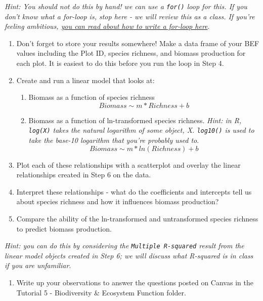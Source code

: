 \documentclass[]{article}
\providecommand{\tightlist}{%
  \setlength{\itemsep}{0pt}\setlength{\parskip}{0pt}}
\begin{document}
\emph{Hint: You \emph{should not} do this by hand! we can use a
\texttt{for()} loop for this. If you don't know what a for-loop is, stop
here - we will review this as a class. If you're feeling ambitious,
\href{https://www.r-bloggers.com/how-to-write-the-first-for-loop-in-r/}{you
can read about how to write a for-loop here}}.

\begin{enumerate}
\def\labelenumi{\arabic{enumi}.}
\setcounter{enumi}{4}
\item
  Don't forget to store your results somewhere! Make a data frame of
  your BEF values including the Plot ID, species richness, and biomass
  production for each plot. It is easiest to do this before you run the
  loop in Step 4.
\item
  Create and run a linear model that looks at:

  \begin{enumerate}
  \def\labelenumii{\alph{enumii}.}
  \item
    Biomass as a function of species richness
    \[Biomass \sim m * Richness + b\]
  \item
    Biomass as a function of ln-transformed species richness.
    \emph{Hint: in R, \texttt{log(X)} takes the natural logarithm of
    some object, X. \texttt{log10()} is used to take the base-10
    logarithm that you're probably used to}.
    \[Biomass \sim m * ln(Richness) + b\]
  \end{enumerate}
\item
  Plot each of these relationships with a scatterplot and overlay the
  linear relationships created in Step 6 on the data.
\item
  Interpret these relationships - what do the coefficients and
  intercepts tell us about species richness and how it influences
  biomass production?
\item
  Compare the ability of the ln-transformed and untransformed species
  richness to predict biomass production.
\end{enumerate}

\emph{Hint: you can do this by considering the
\texttt{Multiple\ R-squared} result from the linear model objects
created in Step 6; we will discuss what R-squared is in class if you are
unfamiliar}.

\begin{enumerate}
\def\labelenumi{\arabic{enumi}.}
\setcounter{enumi}{9}
\tightlist
\item
  Write up your observations to answer the questions posted on Canvas in
  the Tutorial 5 - Biodiversity \& Ecosystem Function folder.
\end{enumerate}
\end{document}
